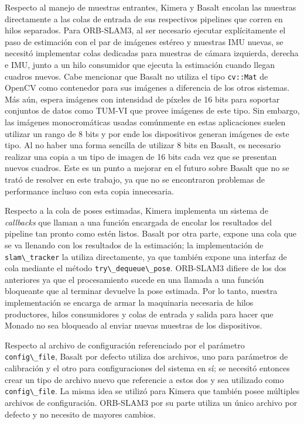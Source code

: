 \documentclass[ twoside,openright,titlepage,numbers=noenddot,%
                headinclude,footinclude,cleardoublepage=empty,abstract=on,
                BCOR=-5mm,paper=a4,fontsize=11pt
                ]{scrreprt}
\newcommand{\passthrough}[1]{#1}
\begin{document}
Respecto al manejo de muestras entrantes, Kimera y Basalt encolan las
muestras directamente a las colas de entrada de sus respectivos
pipelines que corren en hilos separados. Para ORB-SLAM3, al ser
necesario ejecutar explícitamente el paso de estimación con el par de
imágenes estéreo y muestras IMU nuevas, se necesitó implementar colas
dedicadas para muestras de cámara izquierda, derecha e IMU, junto a un
hilo consumidor que ejecuta la estimación cuando llegan cuadros nuevos.
Cabe mencionar que Basalt no utiliza el tipo
\passthrough{\lstinline!cv::Mat!} de OpenCV como contenedor para sus
imágenes a diferencia de los otros sistemas. Más aún, espera imágenes
con intensidad de píxeles de 16 bits para soportar conjuntos de datos
como TUM-VI que provee imágenes de este tipo. Sin embargo, las imágenes
monocromáticas usadas comúnmente en estas aplicaciones suelen utilizar
un rango de 8 bits y por ende los dispositivos generan imágenes de este
tipo. Al no haber una forma sencilla de utilizar 8 bits en Basalt, es
necesario realizar una copia a un tipo de imagen de 16 bits cada vez que
se presentan nuevos cuadros. Este es un punto a mejorar en el futuro
sobre Basalt que no se trató de resolver en este trabajo, ya que no se
encontraron problemas de performance incluso con esta copia innecesaria.

Respecto a la cola de poses estimadas, Kimera implementa un sistema de
\emph{callbacks} que llaman a una función encargada de encolar los
resultados del pipeline tan pronto como estén listos. Basalt por otra
parte, expone una cola que se va llenando con los resultados de la
estimación; la implementación de \passthrough{\lstinline!slam\_tracker!}
la utiliza directamente, ya que también expone una interfaz de cola
mediante el método \passthrough{\lstinline!try\_dequeue\_pose!}.
ORB-SLAM3 difiere de los dos anteriores ya que el procesamiento sucede
en una llamada a una función bloqueante que al terminar devuelve la pose
estimada. Por lo tanto, nuestra implementación se encarga de armar la
maquinaria necesaria de hilos productores, hilos consumidores y colas de
entrada y salida para hacer que Monado no sea bloqueado al enviar nuevas
muestras de los dispositivos.

Respecto al archivo de configuración referenciado por el parámetro
\passthrough{\lstinline!config\_file!}, Basalt por defecto utiliza dos
archivos, uno para parámetros de calibración y el otro para
configuraciones del sistema en sí; se necesitó entonces crear un tipo de
archivo nuevo que referencie a estos dos y sea utilizado como
\passthrough{\lstinline!config\_file!}. La misma idea se utilizó para
Kimera que también posee múltiples archivos de configuración. ORB-SLAM3
por su parte utiliza un único archivo por defecto y no necesito de
mayores cambios.
\end{document}
